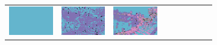 \documentclass{ipol}
\begin{document}
\begin{figure}[ht]
\begin{subfigure}[t]{\linewidth}
\begin{tabular}{ccccccccc}
                \includegraphics[width=\s]{images/night/LINEAR/iso_64_grids.png}&
                \includegraphics[width=\s]{images/night/PPG/iso_64_grids.png}&
                \includegraphics[width=\s]{images/night/VNG/iso_64_grids.png}\\

\end{tabular}
\end{subfigure}
\end{figure}
\end{document}
